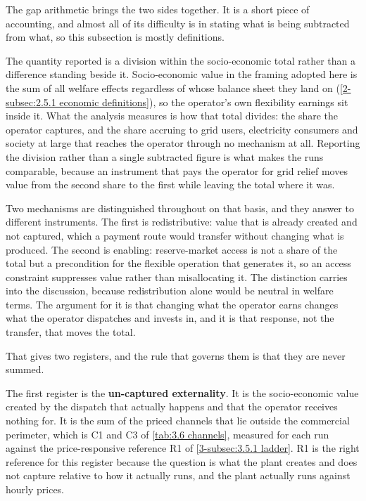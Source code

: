The gap arithmetic brings the two sides together. It is a short piece of accounting, and almost all of its difficulty is in stating what is being subtracted from what, so this subsection is mostly definitions.

The quantity reported is a division within the socio-economic total rather than a difference standing beside it. Socio-economic value in the framing adopted here is the sum of all welfare effects regardless of whose balance sheet they land on (\autoref{2-subsec:2.5.1 economic definitions}), so the operator's own flexibility earnings sit inside it. What the analysis measures is how that total divides: the share the operator captures, and the share accruing to grid users, electricity consumers and society at large that reaches the operator through no mechanism at all. Reporting the division rather than a single subtracted figure is what makes the runs comparable, because an instrument that pays the operator for grid relief moves value from the second share to the first while leaving the total where it was.

Two mechanisms are distinguished throughout on that basis, and they answer to different instruments. The first is redistributive: value that is already created and not captured, which a payment route would transfer without changing what is produced. The second is enabling: reserve-market access is not a share of the total but a precondition for the flexible operation that generates it, so an access constraint suppresses value rather than misallocating it. The distinction carries into the discussion, because redistribution alone would be neutral in welfare terms. The argument for it is that changing what the operator earns changes what the operator dispatches and invests in, and it is that response, not the transfer, that moves the total.

That gives two registers, and the rule that governs them is that they are never summed.

The first register is the \textbf{un-captured externality}. It is the socio-economic value created by the dispatch that actually happens and that the operator receives nothing for. It is the sum of the priced channels that lie outside the commercial perimeter, which is C1 and C3 of \autoref{tab:3.6 channels}, measured for each run against the price-responsive reference R1 of \autoref{3-subsec:3.5.1 ladder}. R1 is the right reference for this register because the question is what the plant creates and does not capture relative to how it actually runs, and the plant actually runs against hourly prices.

